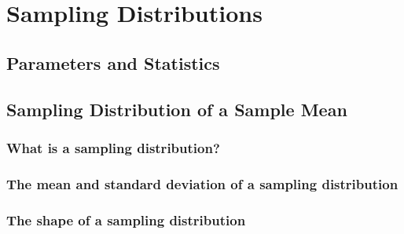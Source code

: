 \chapter{Sampling Distributions}  %

\section{Parameters and Statistics}  %

\section{Sampling Distribution of a Sample Mean}  %
\subsection{What is a sampling distribution?}  %
\subsection{The mean and standard deviation of a sampling distribution}  %
\subsection{The shape of a sampling distribution}  %
